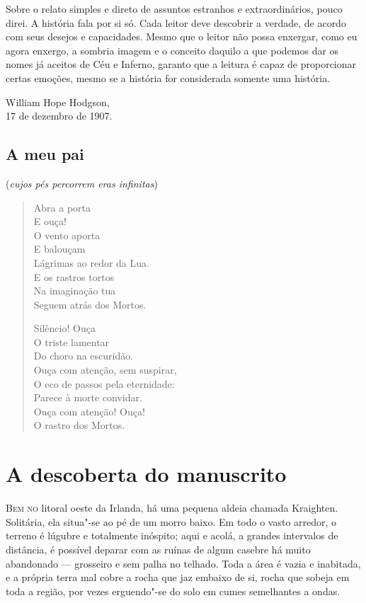 Sobre o relato simples e direto de assuntos estranhos e extraordinários, pouco direi. A história fala por si só. Cada
leitor deve descobrir a verdade, de acordo com seus desejos e capacidades. Mesmo que o leitor não
possa enxergar, como eu agora enxergo, a sombria imagem e o conceito daquilo a que podemos dar os nomes já aceitos de
Céu e Inferno, garanto que a leitura é capaz de proporcionar certas emoções, mesmo se a história for considerada
somente uma história.
\bigskip

{\raggedleft
William Hope Hodgson,\\
17 de dezembro de 1907.
\par}


\clearpage

\section{A meu pai}

\bgroup\centering
(\emph{cujos pés percorrem eras infinitas})
\par\smallskip\egroup

\begin{verse}
Abra a porta\\
E ouça!\\
O vento aporta\\
E balouçam\\
Lágrimas ao redor da Lua.\\
E os rastros tortos\\
Na imaginação tua\\
Seguem atrás dos Mortos.

Silêncio! Ouça\\
O triste lamentar\\
Do choro na escuridão.\\
Ouça com atenção, sem suspirar,\\
O eco de passos pela eternidade:\\
Parece à morte convidar.\\
Ouça com atenção! Ouça!\\
O rastro dos Mortos.
\end{verse}


\cleardoublepage


\chapter{A descoberta do manuscrito}

\textsc{Bem no} litoral oeste da Irlanda, há uma pequena aldeia chamada Kraighten. Solitária, ela situa"-se ao pé de um morro
baixo. Em todo o vasto arredor, o terreno é lúgubre e totalmente inóspito; aqui e acolá, a grandes intervalos de
distância, é possível deparar com as ruínas de algum casebre há muito abandonado --- grosseiro e sem palha no telhado.
Toda a área é vazia e inabitada, e a própria terra mal cobre a rocha que jaz embaixo de si, rocha que sobeja em toda a
região, por vezes erguendo"-se do solo em cumes semelhantes a ondas.

